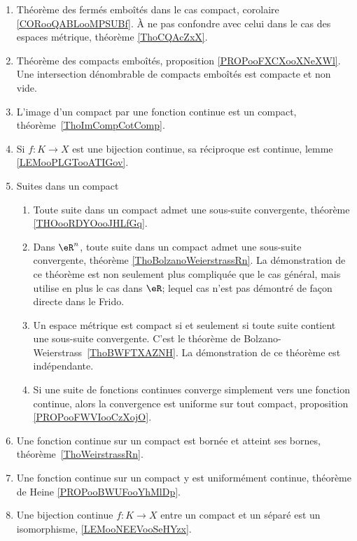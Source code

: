 \begin{description}
\begin{enumerate}
		      \item
		            Théorème des fermés emboîtés dans le cas compact, corolaire \ref{CORooQABLooMPSUBf}. À ne pas confondre avec celui dans le cas des espaces métrique, théorème \ref{ThoCQAcZxX}.
		      \item
		            Théorème des compacts emboîtés, proposition \ref{PROPooFXCXooXNeXWl}. Une intersection dénombrable de compacts emboîtés est compacte et non vide.
		      \item
		            L'image d'un compact par une fonction continue est un compact, théorème~\ref{ThoImCompCotComp}.
		      \item
		            Si \( f\colon K\to X\) est une bijection continue, sa réciproque est continue, lemme \ref{LEMooPLGTooATIGov}.
		      \item
		            Suites dans un compact
		            \begin{enumerate}
			            \item
			                  Toute suite dans un compact admet une sous-suite convergente, théorème \ref{THOooRDYOooJHLfGq}.
			            \item
			                  Dans \( \eR^n\), toute suite dans un compact admet une sous-suite convergente, théorème \ref{ThoBolzanoWeierstrassRn}. La démonstration de ce théorème est non seulement plus compliquée que le cas général, mais utilise en plus le cas dans \( \eR\); lequel cas n'est pas démontré de façon directe dans le Frido.
			            \item
			                  Un espace métrique est compact si et seulement si toute suite contient une sous-suite convergente. C'est le théorème de Bolzano-Weierstrass~\ref{ThoBWFTXAZNH}. La démonstration de ce théorème est indépendante.
			            \item
			                  Si une suite de fonctions continues converge simplement vers une fonction continue, alors la convergence est uniforme sur tout compact, proposition \ref{PROPooFWVIooCzXojO}.
		            \end{enumerate}
		      \item
		            Une fonction continue sur un compact est bornée et atteint ses bornes, théorème~\ref{ThoWeirstrassRn}.
		      \item
		            Une fonction continue sur un compact y est uniformément continue, théorème de Heine \ref{PROPooBWUFooYhMlDp}.
		      \item
		            Une bijection continue \( f\colon K\to X\) entre un compact et un séparé est un isomorphisme, \ref{LEMooNEEVooSeHYzx}.
	      \end{enumerate}


\end{description}
